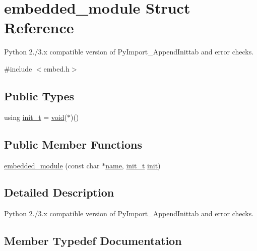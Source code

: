 \hypertarget{structembedded__module}{}\section{embedded\+\_\+module Struct Reference}
\label{structembedded__module}


Python 2./3.x compatible version of {\ttfamily Py\+Import\+\_\+\+Append\+Inittab} and error checks.  




{\ttfamily \#include $<$embed.\+h$>$}

\subsection*{Public Types}
\begin{DoxyCompactItemize}
\item 
using \mbox{\hyperlink{structembedded__module_ae88ae8eea3f77832186b09176e2277d3}{init\+\_\+t}} = \mbox{\hyperlink{_s_d_l__opengles2__gl2ext_8h_ae5d8fa23ad07c48bb609509eae494c95}{void}}($\ast$)()
\end{DoxyCompactItemize}
\subsection*{Public Member Functions}
\begin{DoxyCompactItemize}
\item 
\mbox{\hyperlink{structembedded__module_adf4ff708284d6dc49a7cd5251260973e}{embedded\+\_\+module}} (const char $\ast$\mbox{\hyperlink{structname}{name}}, \mbox{\hyperlink{structembedded__module_ae88ae8eea3f77832186b09176e2277d3}{init\+\_\+t}} \mbox{\hyperlink{pybind11_8h_a144961765ca31801e21d87651871934c}{init}})
\end{DoxyCompactItemize}


\subsection{Detailed Description}
Python 2./3.x compatible version of {\ttfamily Py\+Import\+\_\+\+Append\+Inittab} and error checks. 

\subsection{Member Typedef Documentation}
\mbox{\label{structembedded__module_ae88ae8eea3f77832186b09176e2277d3}} 

